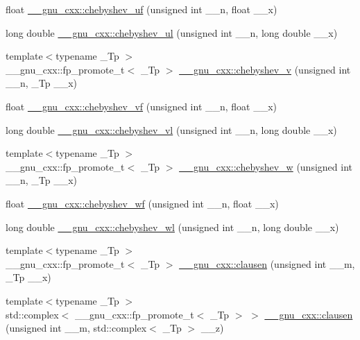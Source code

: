 \begin{DoxyCompactItemize}
\item 
float \hyperlink{group__gnu__math__spec__func_ga4b28c2a079eae2e9612c9902801ca256}{\+\_\+\+\_\+gnu\+\_\+cxx\+::chebyshev\+\_\+uf} (unsigned int \+\_\+\+\_\+n, float \+\_\+\+\_\+x)
\item 
long double \hyperlink{group__gnu__math__spec__func_ga11ec202d6aacafba1182e962ecf02978}{\+\_\+\+\_\+gnu\+\_\+cxx\+::chebyshev\+\_\+ul} (unsigned int \+\_\+\+\_\+n, long double \+\_\+\+\_\+x)
\item 
{\footnotesize template$<$typename \+\_\+\+Tp $>$ }\\\+\_\+\+\_\+gnu\+\_\+cxx\+::fp\+\_\+promote\+\_\+t$<$ \+\_\+\+Tp $>$ \hyperlink{group__gnu__math__spec__func_ga32b7decd0002f542d2c9187c5f0846c6}{\+\_\+\+\_\+gnu\+\_\+cxx\+::chebyshev\+\_\+v} (unsigned int \+\_\+\+\_\+n, \+\_\+\+Tp \+\_\+\+\_\+x)
\item 
float \hyperlink{group__gnu__math__spec__func_gaa9635a0da4bdeaa8060ae5cf03c3a12d}{\+\_\+\+\_\+gnu\+\_\+cxx\+::chebyshev\+\_\+vf} (unsigned int \+\_\+\+\_\+n, float \+\_\+\+\_\+x)
\item 
long double \hyperlink{group__gnu__math__spec__func_gae387ee1bfcd52555ad4d690f5888a078}{\+\_\+\+\_\+gnu\+\_\+cxx\+::chebyshev\+\_\+vl} (unsigned int \+\_\+\+\_\+n, long double \+\_\+\+\_\+x)
\item 
{\footnotesize template$<$typename \+\_\+\+Tp $>$ }\\\+\_\+\+\_\+gnu\+\_\+cxx\+::fp\+\_\+promote\+\_\+t$<$ \+\_\+\+Tp $>$ \hyperlink{group__gnu__math__spec__func_gaa156c6c21e99104ebcb627e92aceada0}{\+\_\+\+\_\+gnu\+\_\+cxx\+::chebyshev\+\_\+w} (unsigned int \+\_\+\+\_\+n, \+\_\+\+Tp \+\_\+\+\_\+x)
\item 
float \hyperlink{group__gnu__math__spec__func_gae6d468cee53df584e40afe294127b090}{\+\_\+\+\_\+gnu\+\_\+cxx\+::chebyshev\+\_\+wf} (unsigned int \+\_\+\+\_\+n, float \+\_\+\+\_\+x)
\item 
long double \hyperlink{group__gnu__math__spec__func_ga1297dfd9b9a0f584435de7d83eb9e9c3}{\+\_\+\+\_\+gnu\+\_\+cxx\+::chebyshev\+\_\+wl} (unsigned int \+\_\+\+\_\+n, long double \+\_\+\+\_\+x)
\item 
{\footnotesize template$<$typename \+\_\+\+Tp $>$ }\\\+\_\+\+\_\+gnu\+\_\+cxx\+::fp\+\_\+promote\+\_\+t$<$ \+\_\+\+Tp $>$ \hyperlink{group__gnu__math__spec__func_ga54e4ba71b1f81718d6998349f91ff88f}{\+\_\+\+\_\+gnu\+\_\+cxx\+::clausen} (unsigned int \+\_\+\+\_\+m, \+\_\+\+Tp \+\_\+\+\_\+x)
\item 
{\footnotesize template$<$typename \+\_\+\+Tp $>$ }\\std\+::complex$<$ \+\_\+\+\_\+gnu\+\_\+cxx\+::fp\+\_\+promote\+\_\+t$<$ \+\_\+\+Tp $>$ $>$ \hyperlink{group__gnu__math__spec__func_gaf7c4317ef6bfd3a4bf0ddcba22ee7588}{\+\_\+\+\_\+gnu\+\_\+cxx\+::clausen} (unsigned int \+\_\+\+\_\+m, std\+::complex$<$ \+\_\+\+Tp $>$ \+\_\+\+\_\+z)

\end{DoxyCompactItemize}
